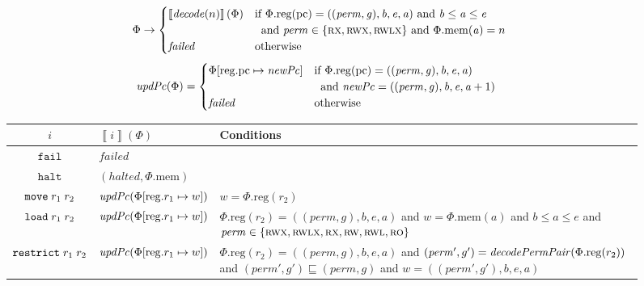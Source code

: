 \documentclass[acmsmall,review]{acmart}\settopmatter{printfolios=true}
\newcommand{\update}[2]{[#1 \mapsto #2]}
\newcommand{\sem}[1]{\left\llbracket #1 \right\rrbracket}
\newcommand{\var}[1]{\mathit{#1}}
\newcommand{\gl}{\var{g}}
\newcommand{\pcreg}{\mathrm{pc}}
\newcommand{\addr}{\var{a}}
\newcommand{\start}{\var{b}}
\newcommand{\addrend}{\var{e}}
\newcommand{\perm}{\var{perm}}
\newcommand{\stdcap}[1][(\perm,\gl)]{\left(#1,\start,\addrend,\addr \right)}
\newcommand{\plainproj}[1]{\mathrm{#1}}
\newcommand{\memheap}[1][\Phi]{#1.\plainproj{mem}}
\newcommand{\memreg}[1][\Phi]{#1.\plainproj{reg}}
\newcommand{\updateReg}[3][\Phi]{#1\update{\plainproj{reg}.#2}{#3}}
\newcommand{\failed}{\mathit{failed}}
\newcommand{\halted}{\mathit{halted}}
\newcommand{\plainfun}[2]{
  \ifthenelse{\equal{#2}{}}
  {\mathit{#1}}
  {\mathit{#1}(#2)}
}
\newcommand{\decode}{\plainfun{decode}{}}
\newcommand{\decodePermPair}{\plainfun{decodePermPair}}
\newcommand{\stdUpdatePc}[1]{\plainfun{updPc}{#1}}
\newcommand{\refreg}[1]{#1}
\newcommand{\refheap}[1]{#1}
\newcommand{\zinstr}[1]{\mathtt{#1}}
\newcommand{\fail}{\zinstr{fail}}
\newcommand{\halt}{\zinstr{halt}}
\newcommand{\twoinstr}[3]{
  \ifthenelse{\equal{#2#3}{}}
  {\zinstr{#1}}
  {\zinstr{#1} \; #2 \; #3}
}
\newcommand{\restricttwo}[2]{\twoinstr{restrict}{#1}{#2}}
\newcommand{\move}[2]{\twoinstr{move}{#1}{#2}}
\newcommand{\load}[2]{\twoinstr{load}{#1}{#2}}
\newcommand{\plainperm}[1]{\textsc{#1}}
\newcommand{\readonly}{\plainperm{ro}}
\newcommand{\readwrite}{\plainperm{rw}}
\newcommand{\exec}{\plainperm{rx}}
\newcommand{\rwx}{\plainperm{rwx}}
\newcommand{\readwritel}{\plainperm{rwl}}
\newcommand{\rwlx}{\plainperm{rwlx}}
\begin{document}
\begin{figure}
  \centering
  \begin{equation*}
    \Phi  \rightarrow
    \begin{cases}
      \sem{\decode(n)}(\Phi) & \arraycolsep=0pt
      \begin{array}[t]{l}
        \text{if $\memreg(\pcreg) = \stdcap$ and $\start \leq \addr \leq \addrend$}\\ 
        \text{\;\;and $\perm \in \{ \exec,\rwx, \rwlx \}$ and $\memheap(\addr) = n$ }
      \end{array}
\\
      \failed                                 & \text{otherwise}
    \end{cases}
  \end{equation*}
  \begin{align*}
    \stdUpdatePc{\Phi} &=
                         \begin{cases}
                           \updateReg{\pcreg}{\var{newPc}} & \arraycolsep=0pt
                           \begin{array}[t]{l}
                             \text{if $\memreg(\pcreg) = \stdcap$}\\
                             \text{\;\;and $\var{newPc} = ((\perm,\gl),\start,\addrend,\addr + 1)$}
                           \end{array}
\\
                             \failed & \text{otherwise}
                         \end{cases}
  \end{align*}
  \begin{tabular}{|c|p{3.4cm}|p{7.3cm}|}
    \hline
    $i$&$\sem{i}(\Phi)$&Conditions\\
    \hline 
    $\fail$&$\failed$&\\
    \hline
    $\halt$&$(\halted,\memheap)$&\\
    \hline
    $\move{\refreg{r_1}}{r_2}$& $\stdUpdatePc{}(\updateReg{r_1}{w})$&$w = \memreg(r_2)$\\
    \hline
    $\load{\refreg{r_1}}{\refheap{r_2}}$&$\stdUpdatePc{\updateReg{r_1}{w}}$&$\memreg(r_2) = \stdcap{}$ and  $w = \memheap(\addr)$ and $\start \leq \addr \leq \addrend$ and $\perm \in \{ \rwx, \rwlx, \exec, \readwrite, \readwritel, \readonly \}$ \\
    \hline
    $\restricttwo{\refreg{r_1}}{r_2}$&$\stdUpdatePc{}(\updateReg{r_1}{w})$  & $\memreg(r_2) = \stdcap$ and $(\perm',g') = \decodePermPair{\memreg(r_2)}$
                                                      and $(\perm',g') \sqsubseteq (\perm,g)$ and  $w =((\perm',g'),\start,\addrend,\addr)$\\

\end{tabular}
\end{figure}
\end{document}
